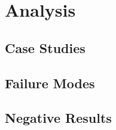 \section{Analysis}\label{sec:analysis}

\subsection{Case Studies}

\subsection{Failure Modes}

\subsection{Negative Results}
